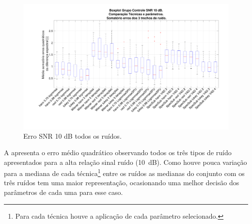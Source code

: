 \begin{figure}[H]
\centering
\includegraphics[width=16cm]{Figs/Erro_10_Ruidos.pdf}
\caption{Erro SNR 10 dB todos os ruídos.}
\label{snr10_3r}
\end{figure}

A  apresenta o erro médio quadrático observando todos os três tipos de ruído apresentados para a alta relação sinal ruído (10~dB). Como houve pouca variação para a mediana de cada técnica\footnote{Para cada técnica houve a aplicação de cada parâmetro selecionado.} entre os ruídos as medianas do conjunto com os três ruídos tem uma maior representação, ocasionando uma melhor decisão dos parâmetros de cada uma para esse caso.




